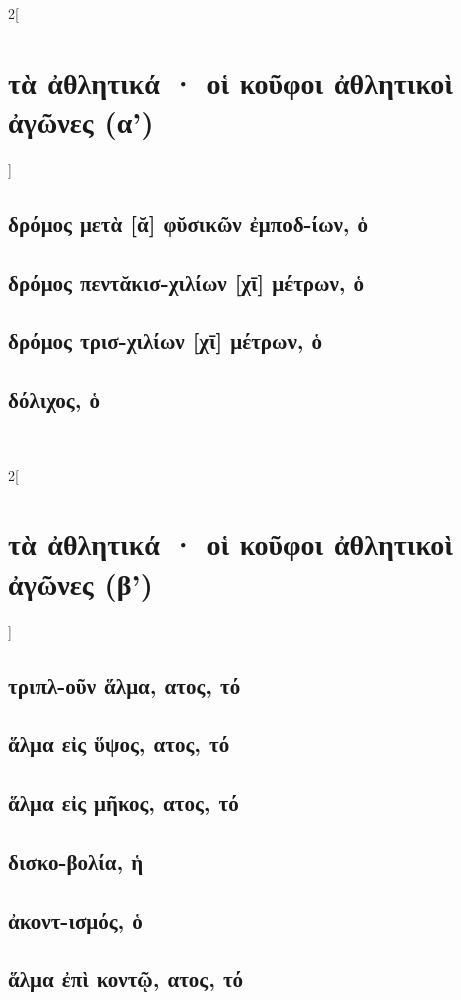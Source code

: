 \documentclass{book}
\begin{document}
\begin{multicols}{2}[\section{τὰ ἀθλητικά · οἱ κοῦφοι ἀθλητικοὶ ἀγῶνες (α')}]
\subsection{δρόμος μετὰ [ᾰ] φῠσικῶν ἐμποδ-ίων, ὁ}
\subsection{δρόμος πεντᾰκισ-χιλίων [χῑ] μέτρων, ὁ}
\subsection{δρόμος τρισ-χιλίων [χῑ] μέτρων, ὁ}
\subsection{δόλιχος, ὁ}
~
\end{multicols}
\newpage 
\begin{multicols}{2}[\section{τὰ ἀθλητικά · οἱ κοῦφοι ἀθλητικοὶ ἀγῶνες (β')}]
{\renewcommand \thesubsection {\thesection} }
\subsection{τριπλ-οῦν ἅλμα, ατος, τό}
\subsection{ἅλμα εἰς ὕψος, ατος, τό}
\subsection{ἅλμα εἰς μῆκος, ατος, τό}
\subsection{δισκο-βολία, ἡ}             
\subsection{ἀκοντ-ισμός, ὁ}             
\subsection{ἅλμα ἐπὶ κοντῷ, ατος, τό}
~
\end{multicols}
\end{document}
